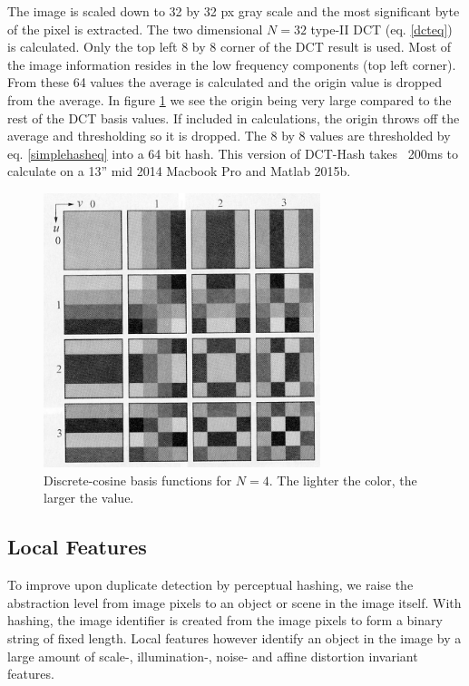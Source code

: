 \documentclass[english,12pt,a4paper,pdftex,elec,utf8, table]{aaltothesis}
\begin{document}
The image is scaled down to 32 by 32 px gray scale and the most significant byte of the pixel is extracted. The two dimensional $N=32$ type-II DCT (eq. \ref{dcteq}) is calculated. Only the top left 8 by 8 corner of the DCT result is used. Most of the image information resides in the low frequency components (top left corner). From these 64 values the average is calculated and the origin value is dropped from the average. In figure \ref{dctkernels} we see the origin being very large compared to the rest of the DCT basis values. If included in calculations, the origin throws off the average and thresholding so it is dropped. The 8 by 8 values are thresholded by eq. \ref{simplehasheq} into a 64 bit hash. This version of DCT-Hash takes ~200ms to calculate on a 13'' mid 2014 Macbook Pro and Matlab 2015b.

\begin{figure}[htb]
\begin{center}
\includegraphics[height=8cm]{figures/dct}
\end{center}
\caption{Discrete-cosine basis functions for $N = 4$. The lighter the color, the larger the value. \cite[p. 473]{Gonzalez2002}}
\label{dctkernels}
\end{figure}

\subsection{Local Features}
To improve upon duplicate detection by perceptual hashing, we raise the abstraction level from image pixels to an object or scene in the image itself. With hashing, the image identifier is created from the image pixels to form a binary string of fixed length. Local features however identify an object in the image by a large amount of scale-, illumination-, noise- and affine distortion invariant features.
\end{document}

